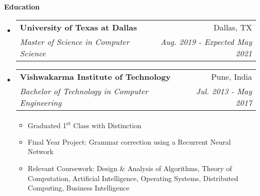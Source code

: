\documentclass[letterpaper,12pt]{article}
\makeatletter
\newcommand{\ts}{\textsuperscript}
\newcommand{\resitem}[1]{\item #1 \vspace{-2pt}}
\newcommand{\resheading}[1]{{\large \colorbox{mygrey}{\begin{minipage}{\textwidth}{\textbf{#1 \vphantom{p\^{E}}}}\end{minipage}}}}
\newcommand{\ressubheading}[4]{
    \begin{tabular*}{7.0in}{l@{\extracolsep{\fill}}r}
      \textbf{#1} & #2 \\
      \textit{#3} & \textit{#4} \\
    \end{tabular*}\vspace{-6pt}}
\newif\ifhighschool
\makeatother
\begin{document}
  \resheading{Education}
  \begin{itemize}
  \item
    \ressubheading{University of Texas at Dallas}{Dallas, TX}{Master of Science in Computer Science}{Aug. 2019 - Expected May 2021}
    \begin{itemize}
    \end{itemize}
  \item
    \ressubheading{Vishwakarma Institute of Technology}{Pune, India}{Bachelor of Technology in Computer Engineering}{Jul. 2013 - May 2017}
    \begin{itemize}
      \resitem {Graduated 1\ts{st} Class with Distinction}
      \resitem {Final Year Project: Grammar correction using a Recurrent Neural Network}
      \resitem{Relevant Coursework: Design \& Analysis of Algorithms, Theory of Computation, Artificial Intelligence, Operating Systems, Distributed Computing, Business Intelligence}
    \end{itemize}
    \ifhighschool	
  \item
    \ressubheading{Delhi Public School}{Pune, India}{12th Grade CBSE}{May 2013}
    \begin{itemize}
      \resitem{Percentage: 76.4\%}
    \end{itemize}
  \item
    \ressubheading{Delhi Public School}{Pune, India}{10th Grade CBSE}{May 2011}
    \begin{itemize}
      \resitem{CGPA: 8.6}
    \end{itemize}
    \fi
  \end{itemize}
  
  \pagebreak
  
\end{document}
